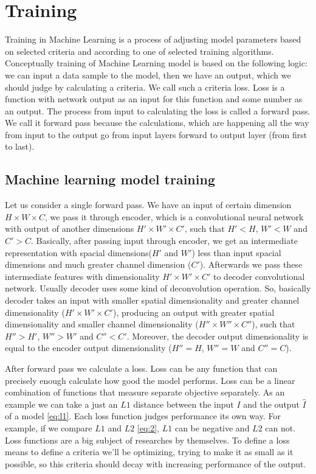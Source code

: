 \section{Training}

Training in Machine Learning is a process of adjusting model parameters based on selected criteria and according to one of selected training algorithms. Conceptually training of Machine Learning model is based on the following logic: we can input a data sample to the model, then we have an output, which we should judge by calculating a criteria. We call such a criteria loss. Loss is a function with network output as an input for this function and some number as an output. The process from input to calculating the loss is called a forward pass. We call it forward pass because the calculations, which are happening all the way from input to the output go from input layers forward to output layer (from first to last).

\subsection{Machine learning model training}

Let us consider a single forward pass. We have an input of certain dimension $H \times W \times C$, we pass it through encoder, which is a convolutional neural network with output of another dimensions $H' \times W' \times C'$, such that $H' < H$, $W' < W$ and $C' > C$. Basically, after passing input through encoder, we get an intermediate representation with spacial dimensions($H'$ and $W'$) less than input spacial dimensions and much greater channel dimension ($C'$). Afterwards we pass these intermediate features with dimensionality $H' \times W' \times C'$ to decoder convolutional network. Usually decoder uses some kind of deconvolution operation. So, basically decoder takes an input with smaller spatial dimensionality and greater channel dimensionality ($H' \times W' \times C'$), producing an output with greater spatial dimensionality and smaller channel dimensionality ($H'' \times W'' \times C''$), such that $H'' > H'$, $W'' > W'$ and $C'' < C'$. Moreover, the decoder output dimensionality is equal to the encoder output dimensionality ($H'' = H$, $W'' = W$ and $C'' = C$).

After forward pass we calculate a loss. Loss can be any function that can precisely enough calculate how good the model performs. Loss can be a linear combination of functions that measure separate objective separately. As an example we can take a just an $L1$ distance between the input $I$ and the output $\hat{I}$ of a model \ref{eq:l1}. Each loss function judges performance its own way. For example, if we compare $L1$ and $L2$ \ref{eq:2}, $L1$ can be negative and $L2$ can not. Loss functions are a big subject of researches by themselves. To define a loss means to define a criteria we'll be optimizing, trying to make it as small as it possible, so this criteria should decay with increasing performance of the output.


